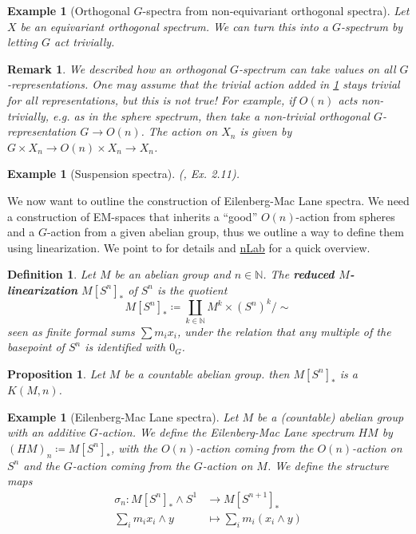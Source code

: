 \documentclass{scrartcl}
\newcommand{\textbi}[1]{\textbf{\textit{#1}}}
\newcommand{\bN}{\mathbb{N}}
\newtheorem{defin}[subsection]{Definition}
\newtheorem{prop}[subsection]{Proposition}
\newtheorem{rem}[subsection]{Remark}
\newtheorem{ex}[subsection]{Example}
\begin{document}
\begin{ex}[Orthogonal $G$-spectra from non-equivariant orthogonal spectra]\label{triv}
    Let $X$ be an equivariant orthogonal spectrum. We can turn this into a $G$-spectrum by letting $G$ act trivially.
\end{ex}

\begin{rem}
    We described how an orthogonal $G$-spectrum can take values on all $G$-representations. One may assume that the trivial action added in \ref{triv} stays trivial for all representations, but this is not true! For example, if $O(n)$ acts non-trivially, e.g. as in the sphere spectrum, then take a non-trivial orthogonal $G$-representation $G\to O(n)$. The action on $X_n$ is given by $G\times X_n\to O(n)\times X_n\to X_n$.
\end{rem}

\begin{ex}[Suspension spectra]
    (\cite{Sch23}, Ex. 2.11).   
\end{ex}

We now want to outline the construction of Eilenberg-Mac Lane spectra. We need a construction of EM-spaces that inherits a ``good'' $O(n)$-action from spheres and a $G$-action from a given abelian group, thus we outline a way to define them using linearization. We point to \cite[6.4]{AGP} for details and \href{https://ncatlab.org/nlab/show/Eilenberg-Mac+Lane+space#via_linearization_of_spheres}{nLab} for a quick overview.

\begin{defin}
    Let $M$ be an abelian group and $n\in \bN$. The \textbi{reduced $M$-linearization} $M[S^n]_*$ of $S^n$ is the quotient $$M[S^n]_*\coloneqq \coprod_{k\in\bN}M^k\times (S^n)^k\big/\sim$$
    seen as finite formal sums $\sum m_ix_i$, under the relation that any multiple of the basepoint of $S^n$ is identified with $0_G$. 
\end{defin}

\begin{prop}
    Let $M$ be a countable abelian group. then $M[S^n]_*$ is a $K(M,n)$.
\end{prop}

\begin{ex}[Eilenberg-Mac Lane spectra]
    Let $M$ be a (countable) abelian group with an additive $G$-action. We define the Eilenberg-Mac Lane spectrum $HM$ by $(HM)_n\coloneqq M[S^n]_*$, with the $O(n)$-action coming from the $O(n)$-action on $S^n$ and the $G$-action coming from the $G$-action on $M$. We define the structure maps
    \begin{align*}
        \sigma_n: M[S^n]_*\wedge S^1&\to M[S^{n+1}]_* \\
        \sum_i m_ix_i \wedge y &\mapsto \sum_i m_i(x_i\wedge y)
    \end{align*}
\end{ex} 
\end{document}
